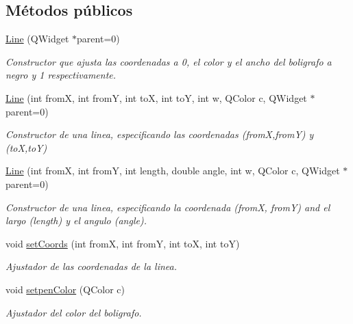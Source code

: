 \subsection*{Métodos públicos}
\begin{DoxyCompactItemize}
\item 
\hypertarget{class_line_a4d475f9d634f50933ca84e25d7cf32f9}{}\hyperlink{class_line_a4d475f9d634f50933ca84e25d7cf32f9}{Line} (Q\+Widget $\ast$parent=0)\label{class_line_a4d475f9d634f50933ca84e25d7cf32f9}

\begin{DoxyCompactList}\small\item\em Constructor que ajusta las coordenadas a 0, el color y el ancho del boligrafo a negro y 1 respectivamente. \end{DoxyCompactList}\item 
\hyperlink{class_line_a37f70dab8d5cc7560e6362093a3aa1b9}{Line} (int from\+X, int from\+Y, int to\+X, int to\+Y, int w, Q\+Color c, Q\+Widget $\ast$parent=0)
\begin{DoxyCompactList}\small\item\em Constructor de una linea, especificando las coordenadas (from\+X,from\+Y) y (to\+X,to\+Y) \end{DoxyCompactList}\item 
\hyperlink{class_line_a742b2aea487313953635d1e504c6b866}{Line} (int from\+X, int from\+Y, int length, double angle, int w, Q\+Color c, Q\+Widget $\ast$parent=0)
\begin{DoxyCompactList}\small\item\em Constructor de una linea, especificando la coordenada (from\+X, from\+Y) and el largo (length) y el angulo (angle). \end{DoxyCompactList}\item 
void \hyperlink{class_line_ac1475ffee823a7c05b2ac91bfe61596d}{set\+Coords} (int from\+X, int from\+Y, int to\+X, int to\+Y)
\begin{DoxyCompactList}\small\item\em Ajustador de las coordenadas de la linea. \end{DoxyCompactList}\item 
void \hyperlink{class_line_ac5b6d8e786cf3820fa36b8bda7130823}{setpen\+Color} (Q\+Color c)
\begin{DoxyCompactList}\small\item\em Ajustador del color del boligrafo. \end{DoxyCompactList}\item 

\end{DoxyCompactItemize}
